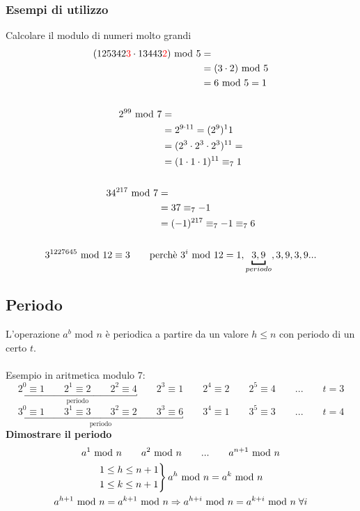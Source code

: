 \documentclass[italian]{article}
\newcommand{\mmod}{\text{ mod }}
\begin{document}
\subsubsection{Esempi di utilizzo}
Calcolare il modulo di numeri molto grandi
\begin{gather*}
	\begin{split}
		(125342\textcolor{red}{3} \cdot 13443\textcolor{red}{2}) \mmod 5 &= \\
		&= (3 \cdot 2) \mmod 5\\
		&= 6 \mmod 5 = 1
	\end{split}\\\\
	\begin{split}
		2^{99} \mmod 7 &= \\
		&= 2^{9\cdot 11} = (2^9)^11 \\
		&= (2^3\cdot 2^3 \cdot 2^3)^{11} = \\
		&= (1\cdot1\cdot1)^{11} \equiv_7 1
	\end{split}\\\\
	\begin{split}
		34^{217} \mmod 7 &= \\
		&= 37\equiv_7 -1 \\
		&= (-1)^{217} \equiv_7 -1 \equiv_7 6
	\end{split}\\\\
	3^{1227645} \mmod 12 \equiv 3 \qquad \text{perchè } 3^i \mmod 12 = 1,\underbracket{3,9}_{periodo},3,9,3,9 ...	
\end{gather*}
\subsection{Periodo}
L'operazione $a^b \mmod n$ è periodica a partire da un valore $h\leq n$ con periodo di un certo $t$.\\\\
Esempio in aritmetica modulo 7:
\[
	\underbracket{2^0 \equiv 1 \qquad 2^1\equiv2 \qquad 2^2\equiv4}_{\text{periodo}} \qquad 2^3 \equiv 1 \qquad 2^4 \equiv 2 \qquad 2^5\equiv4\qquad... \qquad t=3
\]
\[
	\underbracket{3^0 \equiv 1 \qquad 3^1\equiv3 \qquad 3^2\equiv2 \qquad 3^3\equiv6}_{\text{periodo}} \qquad 3^4\equiv1 \qquad 3^5\equiv3 \qquad... \qquad t=4
\]
\newpage
\noindent\textbf{Dimostrare il periodo}
\begin{gather*}
	a^1 \mmod n \qquad a^2 \mmod n \qquad ... \qquad a^{n+1} \mmod n\\
	\begin{rcases*}
		1 \leq h \leq n+1\\
		1\leq k \leq n+1
	\end{rcases*} a^h \mmod n = a^k \mmod n \\
	a^{h+1} \mmod n = a^{k+1} \mmod n \Rightarrow a^{h+i} \mmod n = a^{k+i} \mmod n \; \forall i
\end{gather*}
\end{document}
